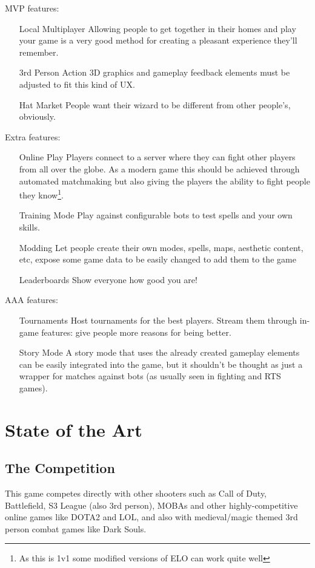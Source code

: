 \documentclass[a4paper, 11pt]{article}
\begin{document}
MVP features:

\begin{enumerate}
 	\item[Local Multiplayer] Allowing people to get together in their homes and play your game is a very good method for creating a pleasant experience they'll remember.
	\item[3rd Person Action] 3D graphics and gameplay feedback elements must be adjusted to fit this kind of UX.
	\item[Hat Market] People want their wizard to be different from other people's, obviously.
\end{enumerate}

Extra features:

\begin{enumerate}
	\item[Online Play] Players connect to a server where they can fight other players from all over the globe. As a modern game this should be achieved through automated matchmaking but also giving the players the ability to fight people they know\footnote{As this is 1v1 some modified versions of ELO can work quite well}.
	\item[Training Mode] Play against configurable bots to test spells and your own skills.
	\item[Modding] Let people create their own modes, spells, maps, aesthetic content, etc, expose some game data to be easily changed to add them to the game
	\item[Leaderboards] Show everyone how good you are!
\end{enumerate}

AAA features:

\begin{enumerate}
	\item[Tournaments] Host tournaments for the best players. Stream them through in-game features: give people more reasons for being better.
	\item[Story Mode] A story mode that uses the already created gameplay elements can be easily integrated into the game, but it shouldn't be thought as just a wrapper for matches against bots (as usually seen in fighting and RTS games).
\end{enumerate}

\newpage
\section*{State of the Art}
\subsection*{The Competition}
This game competes directly with other shooters such as Call of Duty, Battlefield, S3 League (also 3rd person), MOBAs and other highly-competitive online games like DOTA2 and LOL, and also with medieval/magic themed 3rd person combat games like Dark Souls.
\end{document}
